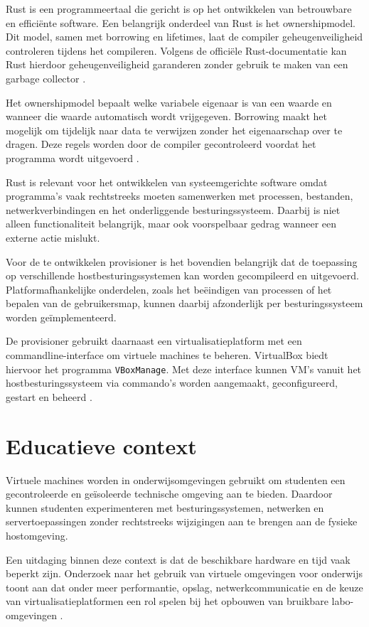 Rust is een programmeertaal die gericht is op het ontwikkelen van betrouwbare en efficiënte software. Een belangrijk onderdeel van Rust is het ownershipmodel. Dit model, samen met borrowing en lifetimes, laat de compiler geheugenveiligheid controleren tijdens het compileren. Volgens de officiële Rust-documentatie kan Rust hierdoor geheugenveiligheid garanderen zonder gebruik te maken van een garbage collector \autocite{Klabnik2018}.

Het ownershipmodel bepaalt welke variabele eigenaar is van een waarde en wanneer die waarde automatisch wordt vrijgegeven. Borrowing maakt het mogelijk om tijdelijk naar data te verwijzen zonder het eigenaarschap over te dragen. Deze regels worden door de compiler gecontroleerd voordat het programma wordt uitgevoerd \autocite{Klabnik2018}.

Rust is relevant voor het ontwikkelen van systeemgerichte software omdat programma's vaak rechtstreeks moeten samenwerken met processen, bestanden, netwerkverbindingen en het onderliggende besturingssysteem. Daarbij is niet alleen functionaliteit belangrijk, maar ook voorspelbaar gedrag wanneer een externe actie mislukt.

Voor de te ontwikkelen provisioner is het bovendien belangrijk dat de toepassing op verschillende hostbesturingssystemen kan worden gecompileerd en uitgevoerd. Platformafhankelijke onderdelen, zoals het beëindigen van processen of het bepalen van de gebruikersmap, kunnen daarbij afzonderlijk per besturingssysteem worden geïmplementeerd.

De provisioner gebruikt daarnaast een virtualisatieplatform met een commandline-interface om virtuele machines te beheren. VirtualBox biedt hiervoor het programma \texttt{VBoxManage}. Met deze interface kunnen VM's vanuit het hostbesturingssysteem via commando's worden aangemaakt, geconfigureerd, gestart en beheerd \autocite{Oracle2022}.

\section{Educatieve context}

Virtuele machines worden in onderwijsomgevingen gebruikt om studenten een gecontroleerde en geïsoleerde technische omgeving aan te bieden. Daardoor kunnen studenten experimenteren met besturingssystemen, netwerken en servertoepassingen zonder rechtstreeks wijzigingen aan te brengen aan de fysieke hostomgeving.

Een uitdaging binnen deze context is dat de beschikbare hardware en tijd vaak beperkt zijn. Onderzoek naar het gebruik van virtuele omgevingen voor onderwijs toont aan dat onder meer performantie, opslag, netwerkcommunicatie en de keuze van virtualisatieplatformen een rol spelen bij het opbouwen van bruikbare labo-omgevingen \autocite{Robison2012}.

